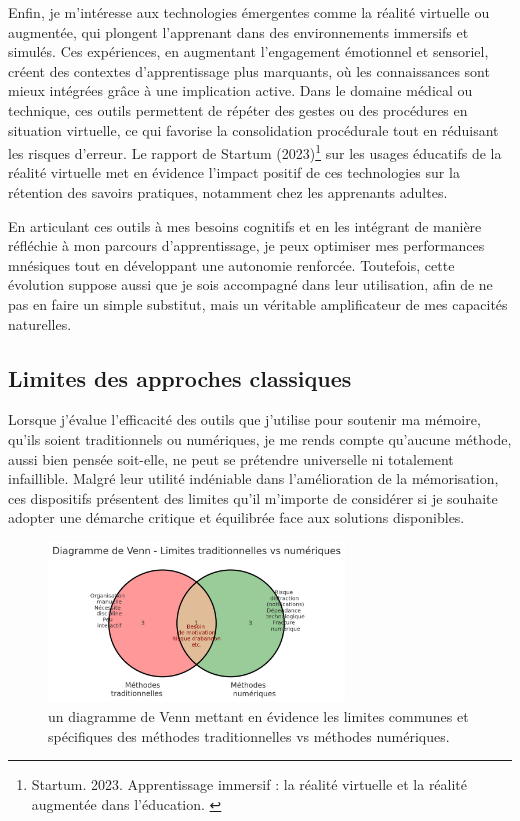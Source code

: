 \documentclass[11pt,a4paper]{report}
\begin{document}
Enfin, je m’intéresse aux technologies émergentes comme la réalité virtuelle ou augmentée, qui plongent l’apprenant dans des environnements immersifs et simulés. Ces expériences, en augmentant l’engagement émotionnel et sensoriel, créent des contextes d’apprentissage plus marquants, où les connaissances sont mieux intégrées grâce à une implication active. Dans le domaine médical ou technique, ces outils permettent de répéter des gestes ou des procédures en situation virtuelle, ce qui favorise la consolidation procédurale tout en réduisant les risques d’erreur. Le rapport de Startum (2023)\footnote{Startum. 2023. Apprentissage immersif : la réalité virtuelle et la réalité augmentée dans l'éducation. \cite{startum}} sur les usages éducatifs de la réalité virtuelle met en évidence l’impact positif de ces technologies sur la rétention des savoirs pratiques, notamment chez les apprenants adultes.

En articulant ces outils à mes besoins cognitifs et en les intégrant de manière réfléchie à mon parcours d’apprentissage, je peux optimiser mes performances mnésiques tout en développant une autonomie renforcée. Toutefois, cette évolution suppose aussi que je sois accompagné dans leur utilisation, afin de ne pas en faire un simple substitut, mais un véritable amplificateur de mes capacités naturelles.

\subsection{Limites des approches classiques}

Lorsque j’évalue l’efficacité des outils que j’utilise pour soutenir ma mémoire, qu’ils soient traditionnels ou numériques, je me rends compte qu’aucune méthode, aussi bien pensée soit-elle, ne peut se prétendre universelle ni totalement infaillible. Malgré leur utilité indéniable dans l’amélioration de la mémorisation, ces dispositifs présentent des limites qu’il m’importe de considérer si je souhaite adopter une démarche critique et équilibrée face aux solutions disponibles.

\begin{figure}[h]
    \centering
    \includegraphics[width=0.7\textwidth]{images/1.3.3.png}
    \caption{un diagramme de Venn mettant en évidence les limites communes et spécifiques des méthodes traditionnelles vs méthodes numériques.}
    \label{fig:1.3.3}
\end{figure}
\end{document}
